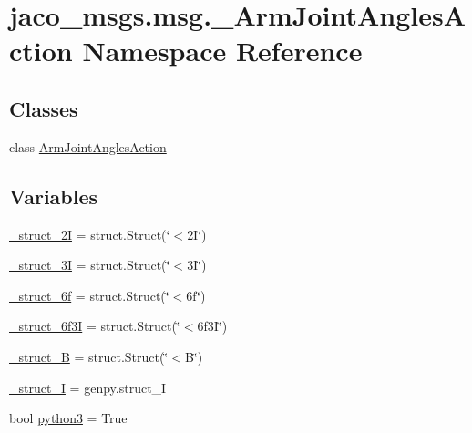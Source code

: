 \hypertarget{namespacejaco__msgs_1_1msg_1_1__ArmJointAnglesAction}{}\section{jaco\+\_\+msgs.\+msg.\+\_\+\+Arm\+Joint\+Angles\+Action Namespace Reference}
\label{namespacejaco__msgs_1_1msg_1_1__ArmJointAnglesAction}
\subsection*{Classes}
\begin{DoxyCompactItemize}
\item 
class \hyperlink{classjaco__msgs_1_1msg_1_1__ArmJointAnglesAction_1_1ArmJointAnglesAction}{Arm\+Joint\+Angles\+Action}
\end{DoxyCompactItemize}
\subsection*{Variables}
\begin{DoxyCompactItemize}
\item 
\hyperlink{namespacejaco__msgs_1_1msg_1_1__ArmJointAnglesAction_a8f44fae04316c3f1720c1b0b01f5933f}{\+\_\+struct\+\_\+2I} = struct.\+Struct(\char`\"{}$<$2\+I\char`\"{})
\item 
\hyperlink{namespacejaco__msgs_1_1msg_1_1__ArmJointAnglesAction_a36cd04b386e17a8c6c5a33d3bf4e381e}{\+\_\+struct\+\_\+3I} = struct.\+Struct(\char`\"{}$<$3\+I\char`\"{})
\item 
\hyperlink{namespacejaco__msgs_1_1msg_1_1__ArmJointAnglesAction_a11c4029d97afe860bc6d8436c1a03d91}{\+\_\+struct\+\_\+6f} = struct.\+Struct(\char`\"{}$<$6f\char`\"{})
\item 
\hyperlink{namespacejaco__msgs_1_1msg_1_1__ArmJointAnglesAction_a88a722deda097fa923b189d1170e5ec5}{\+\_\+struct\+\_\+6f3I} = struct.\+Struct(\char`\"{}$<$6f3\+I\char`\"{})
\item 
\hyperlink{namespacejaco__msgs_1_1msg_1_1__ArmJointAnglesAction_aed82172d7bf8ffff51460a5a0345815f}{\+\_\+struct\+\_\+B} = struct.\+Struct(\char`\"{}$<$B\char`\"{})
\item 
\hyperlink{namespacejaco__msgs_1_1msg_1_1__ArmJointAnglesAction_ab7c8cd3be5a2d381abe99365761f80aa}{\+\_\+struct\+\_\+I} = genpy.\+struct\+\_\+I
\item 
bool \hyperlink{namespacejaco__msgs_1_1msg_1_1__ArmJointAnglesAction_a9c298f92819ca065d3bbe1170cc29249}{python3} = True
\end{DoxyCompactItemize}


